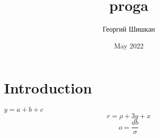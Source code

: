 \documentclass[a4paper]{article}
\title{proga}
\author{Георгий Шишкан}
\date{May 2022}
\begin{document}
\section{Introduction}
$y = a + b + c$
$$ r = \rho + 3y + x$$
\begin{equation}
    o = \frac{db}{\sigma}
\end{equation}
\end{document}
